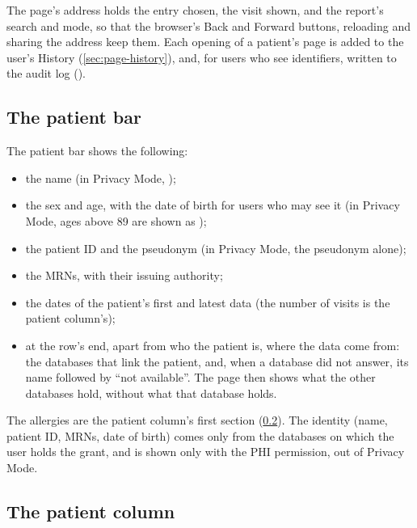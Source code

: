 The page's address holds the entry chosen, the visit shown, and the report's search and mode,
so that the browser's Back and Forward buttons, reloading and sharing the address keep them.
Each opening of a patient's page is added to the user's History (\cref{sec:page-history}), and,
for users who see identifiers, written to the audit log ().

\subsection{The patient bar}
\label{sec:patients-bar}

The patient bar shows the following:
\begin{itemize}
\item the name\phimark{} (in Privacy Mode, );
\item the sex and age, with the date of birth\phimark{} for users who may see it (in Privacy
  Mode, ages above 89 are shown as );
\item the patient ID and the pseudonym (in Privacy Mode, the pseudonym alone);
\item the MRNs\phimark, with their issuing authority;
\item the dates of the patient's first and latest data (the number of visits is the patient
  column's);
\item at the row's end, apart from who the patient is, where the data come from: the databases
  that link the patient, and, when a database did not answer, its name followed by ``not
  available''. The page then shows what the other databases hold, without what that database
  holds.
\end{itemize}
The allergies are the patient column's first section (\cref{sec:patients-column}).
The identity (name, patient ID, MRNs, date of birth) comes only from the databases on which the
user holds the  grant, and is shown only with the PHI permission, out of Privacy Mode.

\subsection{The patient column}
\label{sec:patients-column}

